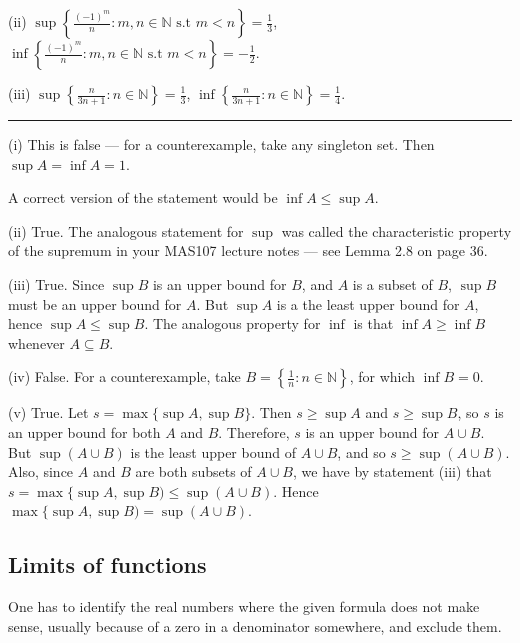 \documentclass[letterpaper,10pt,english]{jupyterBook}
\begin{document}
\sphinxAtStartPar
(ii) \(\displaystyle\sup\left\{\frac{(-1)^m}{n}:m,n\in\mathbb{N} \text{ s.t } m<n\right\}=\frac{1}{3}\), \(\displaystyle\inf\left\{\frac{(-1)^m}{n}:m,n\in\mathbb{N} \text{ s.t } m<n\right\}=-\frac{1}{2}\).

\sphinxAtStartPar
(iii) \(\displaystyle\sup\left\{\frac{n}{3n + 1} :n\in\mathbb{N}\right\}=\frac{1}{3}\), \(\displaystyle\inf\left\{\frac{n}{3n + 1} :n\in\mathbb{N}\right\}=\frac{1}{4}\).


\bigskip\hrule\bigskip


\sphinxAtStartPar
{\hyperref[\detokenize{Problems:p7}]{}}(i) This is false — for a counter\sphinxhyphen{}example, take any singleton set. Then \(\sup A=\inf A=1\).

\sphinxAtStartPar
A correct version of the statement would be \(\inf A \leq \sup A\).

\sphinxAtStartPar
(ii) True. The analogous statement for \(\sup\) was called the characteristic property of the supremum in your MAS107 lecture notes — see Lemma 2.8 on page 36.

\sphinxAtStartPar
(iii) True. Since \(\sup B\) is an upper bound for \(B\), and \(A\) is a subset of \(B\), \(\sup B\) must be an upper bound for \(A\). But \(\sup A\) is a the least upper bound for \(A\), hence \(\sup A\leq \sup B\). The analogous property for \(\inf\) is that \(\inf A\geq\inf B\) whenever \(A\subseteq B\).

\sphinxAtStartPar
(iv) False. For a counter\sphinxhyphen{}example, take \(B=\left\{\frac{1}{n}:n\in\mathbb{N}\right\}\), for which \(\inf B=0\).

\sphinxAtStartPar
(v) True. Let \(s=\max\{\sup A,\sup B\}\). Then \(s\geq \sup A\) and \(s\geq \sup B\), so \(s\) is an upper bound for both \(A\) and \(B\). Therefore, \(s\) is an upper bound for \(A\cup B\). But \(\sup(A\cup B)\) is the least upper bound of \(A\cup B\), and so \(s\geq\sup(A\cup B)\). Also, since \(A\) and \(B\) are both subsets of \(A\cup B\), we have by statement (iii) that \(s=\max\{\sup A,\sup B)\leq\sup(A\cup B)\). Hence \(\max\{\sup A,\sup B)=\sup(A\cup B)\).


\subsection{Limits of functions}
\label{\detokenize{Solutions-full:limits-of-functions}}
\sphinxAtStartPar
{\hyperref[\detokenize{Problems:id1}]{}} One has to identify the real numbers where the given formula does not make sense, usually because of a zero in a denominator somewhere, and exclude them.
\end{document}
